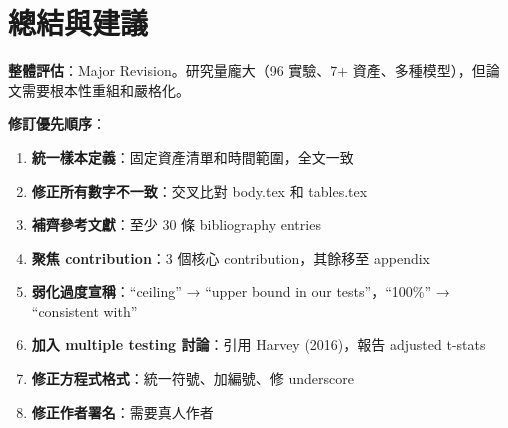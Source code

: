 \documentclass[12pt,a4paper]{article}
\begin{document}
\section*{總結與建議}

\textbf{整體評估}：Major Revision。研究量龐大（96 實驗、7+ 資產、多種模型），但論文需要根本性重組和嚴格化。

\textbf{修訂優先順序}：
\begin{enumerate}
\item \textbf{統一樣本定義}：固定資產清單和時間範圍，全文一致
\item \textbf{修正所有數字不一致}：交叉比對 body.tex 和 tables.tex
\item \textbf{補齊參考文獻}：至少 30 條 bibliography entries
\item \textbf{聚焦 contribution}：3 個核心 contribution，其餘移至 appendix
\item \textbf{弱化過度宣稱}：``ceiling'' → ``upper bound in our tests''，``100\%'' → ``consistent with''
\item \textbf{加入 multiple testing 討論}：引用 Harvey (2016)，報告 adjusted t-stats
\item \textbf{修正方程式格式}：統一符號、加編號、修 underscore
\item \textbf{修正作者署名}：需要真人作者
\end{enumerate}
\end{document}
